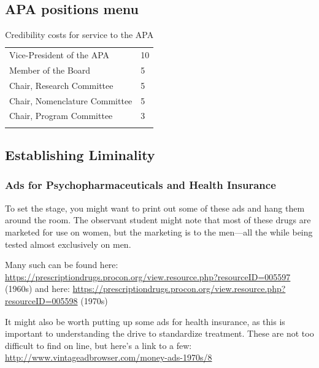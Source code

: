 \begin{refsection}
\newpage

\subsection{APA positions menu}
\label{apapositionsmenu}



    \noindent
  \begin{longtable}[!t]{ | P{7cm} | P{2cm}  | } \hline
{}& \\ \hline 
Vice-President of the APA& 10\\ \hline
Member of the Board &  5\\ \hline
Chair, Research Committee &  5\\ \hline
Chair, Nomenclature Committee &  5\\ \hline
Chair, Program Committee &  3\\ \hline
\caption{Credibility costs for service to the APA}
\label{sample: credibilitypointsmenu}   
\end{longtable}   

  \pagebreak


\subsection{Establishing Liminality}
\label{establishingliminality}

\subsubsection{Ads for Psychopharmaceuticals and Health Insurance}
\label{adsforpsychopharmaceuticalsandhealthinsurance}

To set the stage, you might want to print out some of these ads and hang them around the room. The observant student might note that most of these drugs are marketed for use on women, but the marketing is to the men---all the while being tested almost exclusively on men.

Many such can be found here: \url{https://prescriptiondrugs.procon.org/view.resource.php?resourceID=005597} (1960s) and here: \url{https://prescriptiondrugs.procon.org/view.resource.php?resourceID=005598} (1970s)

It might also be worth putting up some ads for health insurance, as this is important to understanding the drive to standardize treatment. These are not too difficult to find on line, but here’s a link to a few: \url{http://www.vintageadbrowser.com/money-ads-1970s/8} 


\end{refsection}
